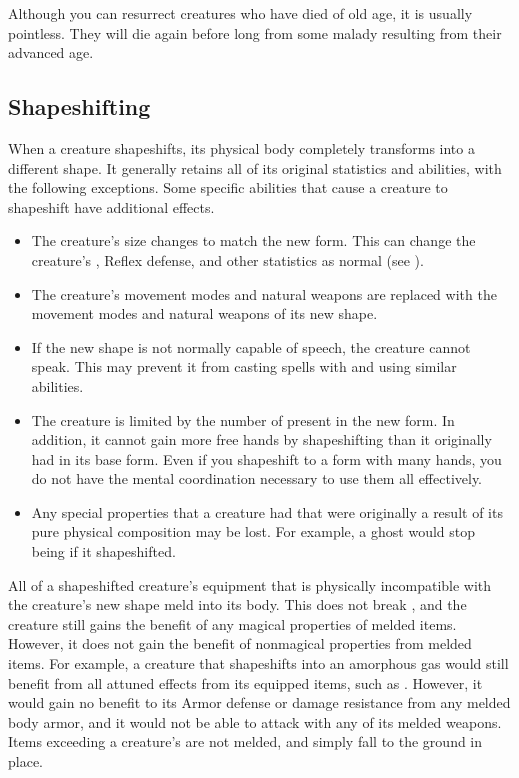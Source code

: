        Although you can resurrect creatures who have died of old age, it is usually pointless.
        They will die again before long from some malady resulting from their advanced age.

    \subsection{Shapeshifting}\label{Shapeshifting}
        When a creature shapeshifts, its physical body completely transforms into a different shape.
        It generally retains all of its original statistics and abilities, with the following exceptions.
        Some specific abilities that cause a creature to shapeshift have additional effects.
        \begin{itemize}
            \item The creature's size changes to match the new form.
                This can change the creature's , Reflex defense, and other statistics as normal (see ).
            \item The creature's  movement modes and natural weapons are replaced with the movement modes and natural weapons of its new shape.
            \item If the new shape is not normally capable of speech, the creature cannot speak.
                This may prevent it from casting spells with  and using similar abilities.
            \item The creature is limited by the number of  present in the new form.
                In addition, it cannot gain more free hands by shapeshifting than it originally had in its base form.
                Even if you shapeshift to a form with many hands, you do not have the mental coordination necessary to use them all effectively.
            \item Any special properties that a creature had that were originally a result of its pure physical composition may be lost.
                For example, a ghost would stop being  if it shapeshifted.
        \end{itemize}

        All of a shapeshifted creature's equipment that is physically incompatible with the creature's new shape meld into its body.
        This does not break , and the creature still gains the benefit of any magical properties of melded items.
        However, it does not gain the benefit of nonmagical properties from melded items.
        For example, a creature that shapeshifts into an amorphous gas would still benefit from all attuned effects from its equipped items, such as .
        However, it would gain no benefit to its Armor defense or damage resistance from any melded body armor, and it would not be able to attack with any of its melded weapons.
        Items exceeding a creature's  are not melded, and simply fall to the ground in place.

